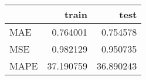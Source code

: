 \begin{tabular}{lrr}
\toprule
{} &      train &       test \\
\midrule
MAE  &   0.764001 &   0.754578 \\
MSE  &   0.982129 &   0.950735 \\
MAPE &  37.190759 &  36.890243 \\
\bottomrule
\end{tabular}
